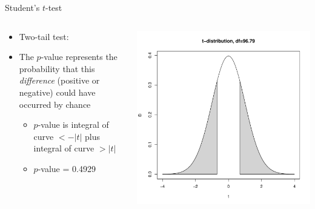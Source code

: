 \documentclass[aspectratio=169]{beamer}\usepackage[]{graphicx}\usepackage[]{color}
\makeatletter
\def\maxwidth{ %
  \ifdim\Gin@nat@width>\linewidth
    \linewidth
  \else
    \Gin@nat@width
  \fi
}
\newenvironment{knitrout}{}{} %
\makeatother
\begin{document}
\begin{frame}[fragile]{Student's $t$-test}
\begin{columns}
  \begin{column}{0.5\textwidth}
  \begin{itemize}
    \item Two-tail test:
    \item The $p$-value represents the probability that this \emph{difference} (positive or negative) could have occurred by chance
    \begin{itemize}
      \item $p$-value is integral of curve $< -|t|$ plus integral of curve $> |t|$
      \item $p$-value = 0.4929
    \end{itemize}
  \end{itemize}
  \end{column}
  \begin{column}{0.5\textwidth}
\begin{knitrout}\scriptsize
{}\color{fgcolor}
\includegraphics[width=\maxwidth]{figure/unnamed-chunk-23-1} 

\end{knitrout}
  \end{column}
\end{columns}
\end{frame}
\end{document}
